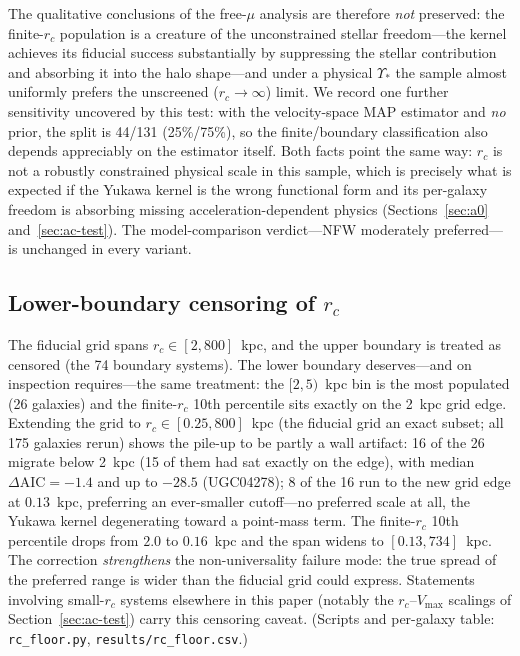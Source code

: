 \documentclass[11pt,a4paper]{article}
\begin{document}
The qualitative conclusions of the free-$\mu$ analysis are
therefore \emph{not} preserved: the finite-$r_c$ population is a
creature of the unconstrained stellar freedom---the kernel
achieves its fiducial success substantially by suppressing the
stellar contribution and absorbing it into the halo shape---and
under a physical $\Upsilon_*$ the sample almost uniformly prefers
the unscreened ($r_c \to \infty$) limit.
We record one further sensitivity uncovered by this test: with
the velocity-space MAP estimator and \emph{no} prior, the split
is 44/131 (25\%/75\%), so the finite/boundary classification also
depends appreciably on the estimator itself.
Both facts point the same way: $r_c$ is not a robustly
constrained physical scale in this sample, which is precisely
what is expected if the Yukawa kernel is the wrong functional
form and its per-galaxy freedom is absorbing missing
acceleration-dependent physics
(Sections~\ref{sec:a0} and~\ref{sec:ac-test}).
The model-comparison verdict---NFW moderately preferred---is
unchanged in every variant.



\subsection{Lower-boundary censoring of $r_c$}

The fiducial grid spans $r_c \in [2, 800]$~kpc, and the upper
boundary is treated as censored (the 74 boundary systems).  The
lower boundary deserves---and on inspection requires---the same
treatment: the $[2,5)$~kpc bin is the most populated (26 galaxies)
and the finite-$r_c$ 10th percentile sits exactly on the 2~kpc grid
edge.  Extending the grid to $r_c \in [0.25, 800]$~kpc (the
fiducial grid an exact subset; all 175 galaxies rerun) shows the
pile-up to be partly a wall artifact: 16 of the 26 migrate below
2~kpc (15 of them had sat exactly on the edge), with median
$\Delta\mathrm{AIC} = -1.4$ and up to $-28.5$ (UGC04278); 8 of
the 16 run to the new grid edge at $0.13$~kpc, preferring an
ever-smaller cutoff---no preferred scale at all, the Yukawa kernel
degenerating toward a point-mass term.  The finite-$r_c$ 10th
percentile drops from $2.0$ to $0.16$~kpc and the span widens to
$[0.13, 734]$~kpc.  The correction \emph{strengthens} the
non-universality failure mode: the true spread of the preferred
range is wider than the fiducial grid could express.  Statements
involving small-$r_c$ systems elsewhere in this paper (notably the
$r_c$--$V_{\max}$ scalings of Section~\ref{sec:ac-test}) carry
this censoring caveat.  (Scripts and per-galaxy table:
\texttt{rc\_floor.py}, \texttt{results/rc\_floor.csv}.)
\end{document}
